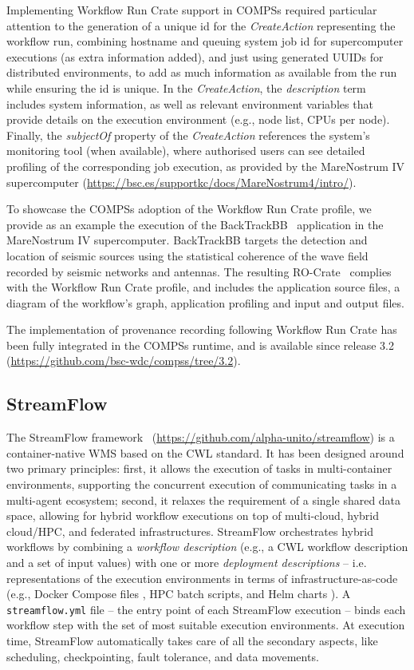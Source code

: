 \documentclass[10pt,letterpaper]{article}
\begin{document}
Implementing Workflow Run Crate support in COMPSs required particular attention to the generation of a unique id for the \emph{CreateAction} representing the workflow run, combining hostname and queuing system job id for supercomputer executions (as extra information added), and just using generated UUIDs for distributed environments, to add as much information as available from the run while ensuring the id is unique.
In the \emph{CreateAction}, the \emph{description} term includes system information, as well as relevant environment variables that provide details on the execution environment (e.g., node list, CPUs per node).
Finally, the \emph{subjectOf} property of the \emph{CreateAction} references the system’s monitoring tool (when available),
where authorised users can see detailed profiling of the corresponding job execution, as provided by the MareNostrum IV supercomputer (\url{https://bsc.es/supportkc/docs/MareNostrum4/intro/}).

To showcase the COMPSs adoption of the Workflow Run Crate profile, we provide as an example the execution of the BackTrackBB~\cite{Poiata 2016}
application in the MareNostrum IV supercomputer.
BackTrackBB targets the detection and location of seismic sources using the statistical coherence of the wave field recorded by seismic networks and antennas.
The resulting RO-Crate~\cite{Poiata 2023} complies with the Workflow Run Crate profile, and includes the application source files, a diagram of the workflow's graph, application profiling and input and output files.

The implementation of provenance recording following Workflow Run Crate has been fully integrated in the COMPSs runtime, and is available since release 3.2 \cite{Ejarque 2023} (\url{https://github.com/bsc-wdc/compss/tree/3.2}).


\subsection{StreamFlow}\label{streamflow}

The StreamFlow framework~\cite{Colonnelli 2021} (\url{https://github.com/alpha-unito/streamflow}) is a container-native WMS based on the CWL standard.
It has been designed around two primary principles: first, it allows the execution of tasks in multi-container environments, supporting the concurrent execution of communicating tasks in a multi-agent ecosystem; second, it relaxes the requirement of a single shared data space, allowing for hybrid workflow executions on top of multi-cloud, hybrid cloud/HPC, and federated infrastructures.
StreamFlow orchestrates hybrid workflows by combining a \emph{workflow description} (e.g., a CWL workflow description and a set of input values) with one or more \emph{deployment descriptions} -- i.e.
representations of the execution environments in terms of infrastructure-as-code (e.g., Docker Compose files \cite{Reis 2022}, HPC batch scripts, and Helm charts \cite{Zerouali 2023}).
A \texttt{streamflow.yml} file -- the entry point of each StreamFlow execution -- binds each workflow step with the set of most suitable execution environments.
At execution time, StreamFlow automatically takes care of all the secondary aspects, like scheduling, checkpointing, fault tolerance, and data movements.
\end{document}
